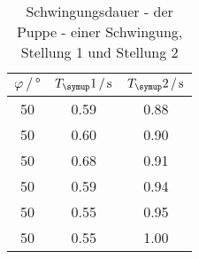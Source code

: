\begin{table}
  \centering
  \begin{tabular}{c c c}
    \toprule
    $\varphi\,/\,\si{\degree}$ & $T_\su{1}\,/\,\si{\second}$ & $T_\su{2}\,/\,\si{\second}$ \\
    \midrule
    50 & 0.59 & 0.88 \\
    50 & 0.60 & 0.90 \\
    50 & 0.68 & 0.91 \\
    50 & 0.59 & 0.94 \\
    50 & 0.55 & 0.95 \\
    50 & 0.55 & 1.00 \\
    \bottomrule
  \end{tabular}
  \caption{Schwingungsdauer - der Puppe - einer Schwingung, Stellung 1 und Stellung 2}
  \label{tab:ZeitPuppe}
\end{table}
